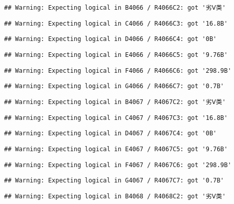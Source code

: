 \documentclass[
]{article}
\begin{document}
\begin{verbatim}
## Warning: Expecting logical in B4066 / R4066C2: got '劣Ⅴ类'
\end{verbatim}

\begin{verbatim}
## Warning: Expecting logical in C4066 / R4066C3: got '16.8B'
\end{verbatim}

\begin{verbatim}
## Warning: Expecting logical in D4066 / R4066C4: got '0B'
\end{verbatim}

\begin{verbatim}
## Warning: Expecting logical in E4066 / R4066C5: got '9.76B'
\end{verbatim}

\begin{verbatim}
## Warning: Expecting logical in F4066 / R4066C6: got '298.9B'
\end{verbatim}

\begin{verbatim}
## Warning: Expecting logical in G4066 / R4066C7: got '0.7B'
\end{verbatim}

\begin{verbatim}
## Warning: Expecting logical in B4067 / R4067C2: got '劣Ⅴ类'
\end{verbatim}

\begin{verbatim}
## Warning: Expecting logical in C4067 / R4067C3: got '16.8B'
\end{verbatim}

\begin{verbatim}
## Warning: Expecting logical in D4067 / R4067C4: got '0B'
\end{verbatim}

\begin{verbatim}
## Warning: Expecting logical in E4067 / R4067C5: got '9.76B'
\end{verbatim}

\begin{verbatim}
## Warning: Expecting logical in F4067 / R4067C6: got '298.9B'
\end{verbatim}

\begin{verbatim}
## Warning: Expecting logical in G4067 / R4067C7: got '0.7B'
\end{verbatim}

\begin{verbatim}
## Warning: Expecting logical in B4068 / R4068C2: got '劣Ⅴ类'
\end{verbatim}
\end{document}
